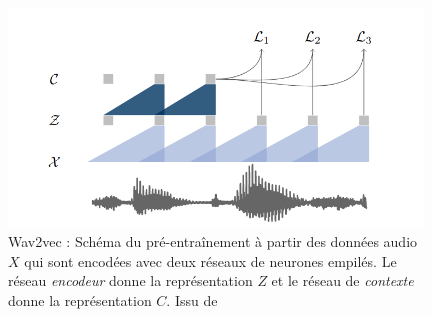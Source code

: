 \begin{figure}[h]
  \centering
  \includegraphics[width=11cm]{./Chapitre2/figures/wav2vec.png}
  \caption{Wav2vec : Schéma du pré-entraînement à partir des données audio $X$ qui sont encodées avec deux réseaux de neurones empilés. Le réseau \textit{encodeur} donne la représentation $Z$ et le réseau de \textit{contexte} donne la représentation $C$. Issu de~\cite{Schneider2019}}
  \label{fig:wav2vec}
\end{figure}
